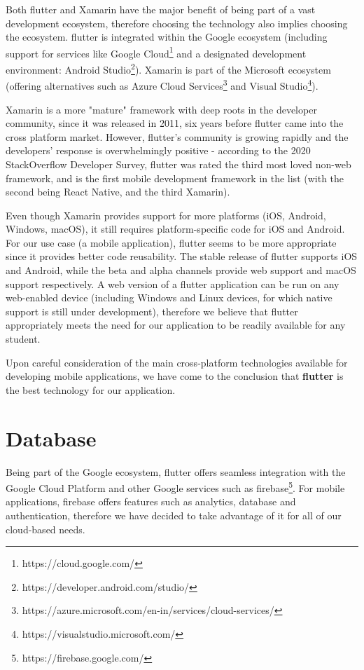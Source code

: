 Both \gls{flutter} and Xamarin have the major benefit of being part of a vast development ecosystem, therefore choosing the technology also implies choosing the ecosystem. \gls{flutter} is integrated within the Google ecosystem (including support for services like Google Cloud\footnote{https://cloud.google.com/} and a designated development environment: Android Studio\footnote{https://developer.android.com/studio/}). Xamarin is part of the Microsoft ecosystem (offering alternatives such as Azure Cloud Services\footnote{https://azure.microsoft.com/en-in/services/cloud-services/} and Visual Studio\footnote{https://visualstudio.microsoft.com/}).

Xamarin is a more "mature" framework with deep roots in the developer community, since it was released in 2011, six years before \gls{flutter} came into the cross platform market. However, \gls{flutter}'s community is growing rapidly and the developers' response is overwhelmingly positive - according to the 2020 StackOverflow Developer Survey\cite{stackoverflow2020survey}, \gls{flutter} was rated the third most loved non-web framework, and is the first mobile development framework in the list (with the second being React Native, and the third Xamarin).

Even though Xamarin provides support for more platforms (iOS, Android, Windows, macOS), it still requires platform-specific code for iOS and Android. For our use case (a mobile application), \gls{flutter} seems to be more appropriate since it provides better code reusability. The stable release of \gls{flutter} supports iOS and Android, while the beta and alpha channels provide web support and macOS support respectively. A web version of a \gls{flutter} application can be run on any web-enabled device (including Windows and Linux devices, for which native support is still under development), therefore we believe that \gls{flutter} appropriately meets the need for our application to be readily available for any student.

Upon careful consideration of the main cross-platform technologies available for developing mobile applications, we have come to the conclusion that \textbf{\gls{flutter}} is the best technology for our application.

\section{Database} \label{5:database}

Being part of the Google ecosystem, \gls{flutter} offers seamless integration with the Google Cloud Platform and other Google services such as \gls{firebase}\footnote{https://firebase.google.com/}. For mobile applications, \gls{firebase} offers features such as analytics, database and authentication, therefore we have decided to take advantage of it for all of our cloud-based needs.

